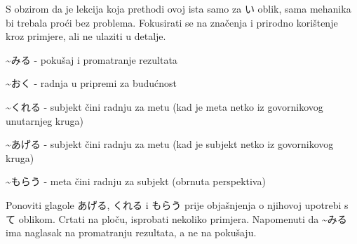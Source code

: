 
\author{Tomislav Mamić}

	
	S obzirom da je lekcija koja prethodi ovoj ista samo za い oblik, sama mehanika bi trebala proći bez problema. Fokusirati se na značenja i prirodno korištenje kroz primjere, ali ne ulaziti u detalje.
	
	\begin{hyou}
		\item \textasciitilde みる - pokušaj i promatranje rezultata
		\item \textasciitilde おく - radnja u pripremi za budućnost
		\item \textasciitilde くれる - subjekt čini radnju za metu (kad je meta netko iz govornikovog unutarnjeg kruga)
		\item \textasciitilde あげる - subjekt čini radnju za metu (kad je subjekt netko iz govornikovog kruga)
		\item \textasciitilde もらう - meta čini radnju za subjekt (obrnuta perspektiva)
	\end{hyou}

	
	Ponoviti glagole あげる, くれる i もらう prije objašnjenja o njihovoj upotrebi s て oblikom. Crtati na ploču, isprobati nekoliko primjera. Napomenuti da \textasciitilde みる ima naglasak na promatranju rezultata, a ne na pokušaju.
